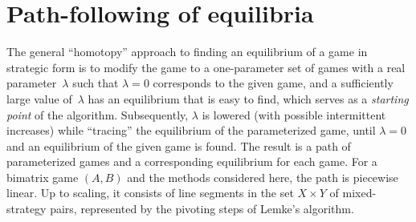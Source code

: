 \documentclass[a4paper,12pt]{article}  %
\theoremstyle{definition}
\def\proof{\noindent{\em Proof.\enspace}}
\def\endproof{\hfill\strut\nobreak\hfill\tombstone\par\medbreak}
\def\tombstone{\hbox{\lower.4pt\vbox{\hrule\hbox{\vrule
  \kern7.6pt\vrule height7.6pt}\hrule}\kern.5pt}}
\newcommand{\T}{^{\top}}
\newcommand{\0}{{\mathbf0}}
\newcommand{\1}{{\mathbf1}}
\begin{document}
% 
% 
\section{Path-following of equilibria}
\label{s-path}

The general ``homotopy'' approach to finding an equilibrium
of a game in strategic form is to modify the game to a
one-parameter set of games with a real parameter~$\lambda$
such that $\lambda=0$ corresponds to the given game, and a
sufficiently large value of~$\lambda$ has an equilibrium
that is easy to find, which serves as a \textit{starting
point} of the algorithm.
Subsequently, $\lambda$ is lowered (with possible
intermittent increases) while ``tracing'' the equilibrium of
the parameterized game, until $\lambda=0$ and an equilibrium
of the given game is found.
The result is a path of parameterized games and a 
corresponding equilibrium for each game.
For a bimatrix game $(A,B)$ and the methods considered here,
the path is piecewise linear.
Up to scaling, it consists of line segments in the set
$X\times Y$ of mixed-strategy pairs, represented by the
pivoting steps of Lemke's algorithm.
\end{document}
